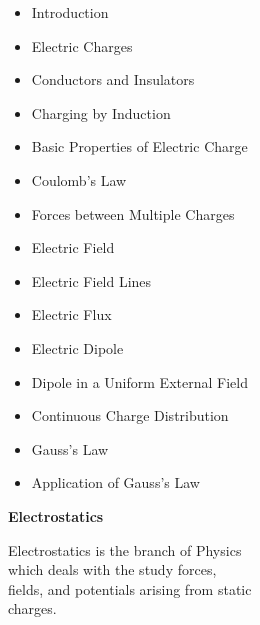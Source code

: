 \begin{frame}
\begin{frame}[plain]
    \begin{minipage}{0.85\textwidth}
        \textcolor{familiarGreen}{
        \begin{itemize}
        \item[\faArrowRight] Introduction
        \item[\faArrowRight] Electric Charges
        \item[\faArrowRight] Conductors and Insulators
        \item[\faArrowRight] Charging by Induction
        \item[\faArrowRight] Basic Properties of Electric Charge
        \item[\faArrowRight] Coulomb's Law
        \item[\faArrowRight] Forces between Multiple Charges
        \item[\faArrowRight] Electric Field
        \item[\faArrowRight] Electric Field Lines
        \item[\faArrowRight] Electric Flux
        \item[\faArrowRight] Electric Dipole
        \item[\faArrowRight] Dipole in a Uniform External Field
        \item[\faArrowRight] Continuous Charge Distribution
        \item[\faArrowRight] Gauss's Law
        \item[\faArrowRight] Application of Gauss's Law
        \end{itemize}
        }
    \end{minipage}
    
    \vfill
    \relax
\end{frame}

\begin{frame}[plain]
    \centering
    
    {\Huge\color{accentorange}\textbf{Electrostatics}}
    
    \vspace{1.5cm}
    
    {\Large\color{black}
    Electrostatics is the branch of Physics \\
    which deals with the study forces, \\
    fields, and potentials arising from static \\
    charges.}
    

\end{frame}
\end{frame}
